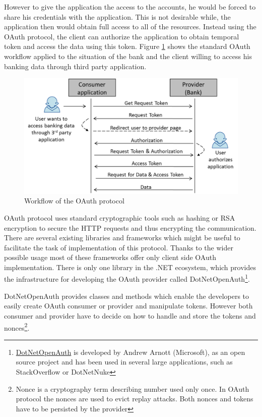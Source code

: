 However to give the application the access to the accounts, he would be forced to share his credentials with the application. This is not desirable while, the application then would obtain full access to all of the resources. Instead using the OAuth protocol, the client can authorize the application to obtain temporal token and access the data using this token. Figure \ref{fig:oauth_workflow} shows the standard OAuth workflow applied to the situation of the bank and the client willing to access his banking data through third party application.

\begin{figure}[h]
\begin{center}
\includegraphics[width=14cm]{figures/oauth_workflow}
\caption{Workflow of the OAuth protocol}
\label{fig:oauth_workflow}
\end{center}
\end{figure}

OAuth protocol uses standard cryptographic tools such as hashing or RSA encryption to secure the HTTP requests and thus encrypting the communication. There are several existing libraries and frameworks which might be useful to facilitate the task of implementation of this protocol. Thanks to the wider possible usage most of these frameworks offer only client side OAuth implementation. There is only one library in the .NET ecosystem, which provides the infrastructure for developing the OAuth provider called DotNetOpenAuth\footnote{\href{http://www.dotnetopenauth.net/}{DotNetOpenAuth} is developed by Andrew Arnott (Microsoft), as an open source project and has been used in several large applications, such as StackOverflow or DotNetNuke}.

DotNetOpenAuth provides classes and methods which enable the developers to easily create OAuth consumer or provider and manipulate tokens. However both consumer and provider have to decide on how to handle and store the tokens and nonces\footnote{Nonce is a cryptography term describing number used only once. In OAuth protocol the nonces are used to evict replay attacks. Both nonces and tokens have to be persisted by the provider}.

